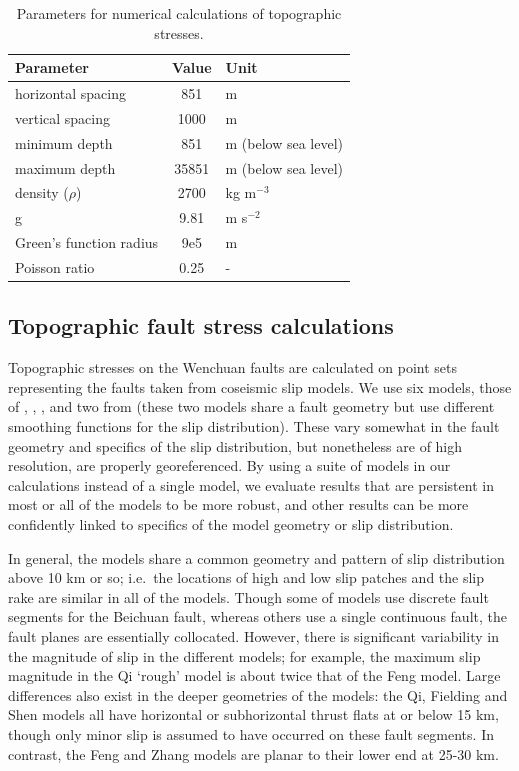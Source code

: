 \documentclass[twocolumn,jgrga]{AGUTeX}
\begin{document}
\begin{article}
\begin{table}
\centering
\begin{tabular}{l c l}
\hline
Parameter & Value & Unit \\
\hline
horizontal spacing & 851 & m \\ 
vertical spacing & 1000 & m \\ 
minimum depth & 851 & m (below sea level) \\ 
maximum depth & 35851 & m (below sea level) \\ 
density ($\rho$) & 2700 & kg m$^{-3}$ \\ 
g & 9.81 & m s$^{-2}$ \\ 
Green's function radius & 9e5 & m \\ 
Poisson ratio & 0.25 & - \\ 
\hline
\end{tabular}
\caption{Parameters for numerical calculations of topographic stresses.}
\label{table:convo_params}
\end{table}

\subsection{Topographic fault stress
calculations}\label{topographic-fault-stress-calculations}

Topographic stresses on the Wenchuan faults are calculated on point sets
representing the faults taken from coseismic slip models. We use six models,
those of \citet{shen2009}, \citet{feng2010}, \citet{zhang2011},
\citet{fielding2013} and two from \citet{qi2011} (these two models share a
fault geometry but use different smoothing functions for the slip
distribution). These vary somewhat in the fault geometry and specifics of the
slip distribution, but nonetheless are of high resolution, are properly
georeferenced. By using a suite of models in our calculations instead of a
single model, we evaluate results that are persistent in most or all of the
models to be more robust, and other results can be more confidently linked to
specifics of the model geometry or slip distribution. 

In general, the models share a common geometry and pattern of slip distribution
above 10 km or so; i.e.\ the locations of high and low slip patches and the slip
rake are similar in all of the models. Though some of models use discrete fault
segments for the Beichuan fault, whereas others use a single continuous fault,
the fault planes are essentially collocated. However, there is significant
variability in the magnitude of slip in the different models; for example, the
maximum slip magnitude in the Qi `rough' model is about twice that of the
Feng model. Large differences also exist in the deeper geometries of the
models: the Qi, Fielding and Shen models all have horizontal or subhorizontal
thrust flats at or below 15 km, though only minor slip is assumed to have
occurred on these fault segments. In contrast, the Feng and Zhang models are
planar to their lower end at 25-30 km.


\end{article}
\end{document}
